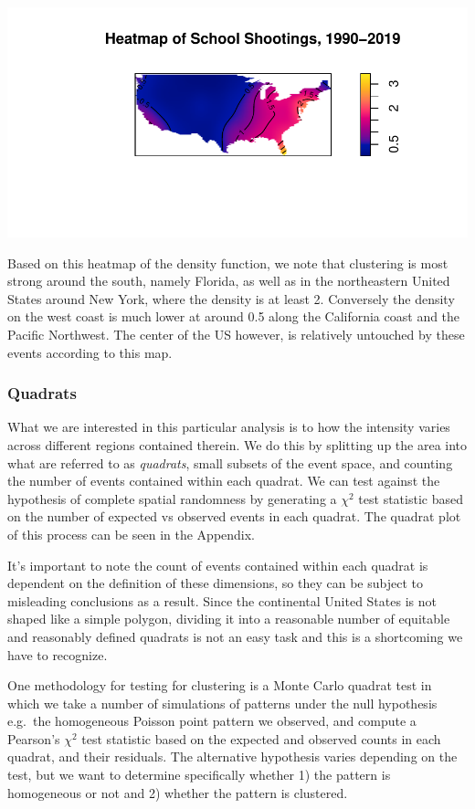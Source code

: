 \documentclass[
  12pt,
]{article}
\begin{document}
\includegraphics{JStevenRaquel_STATS295_Final_files/figure-latex/density-90-19-1.pdf}

Based on this heatmap of the density function, we note that clustering
is most strong around the south, namely Florida, as well as in the
northeastern United States around New York, where the density is at
least 2. Conversely the density on the west coast is much lower at
around 0.5 along the California coast and the Pacific Northwest. The
center of the US however, is relatively untouched by these events
according to this map.

\hypertarget{quadrats}{%
\subsubsection{Quadrats}\label{quadrats}}

What we are interested in this particular analysis is to how the
intensity varies across different regions contained therein. We do this
by splitting up the area into what are referred to as \emph{quadrats},
small subsets of the event space, and counting the number of events
contained within each quadrat. We can test against the hypothesis of
complete spatial randomness by generating a \(\chi^2\) test statistic
based on the number of expected vs observed events in each quadrat. The
quadrat plot of this process can be seen in the Appendix.

It's important to note the count of events contained within each quadrat
is dependent on the definition of these dimensions, so they can be
subject to misleading conclusions as a result. Since the continental
United States is not shaped like a simple polygon, dividing it into a
reasonable number of equitable and reasonably defined quadrats is not an
easy task and this is a shortcoming we have to recognize.

One methodology for testing for clustering is a Monte Carlo quadrat test
in which we take a number of simulations of patterns under the null
hypothesis e.g.~the homogeneous Poisson point pattern we observed, and
compute a Pearson's \(\chi^2\) test statistic based on the expected and
observed counts in each quadrat, and their residuals. The alternative
hypothesis varies depending on the test, but we want to determine
specifically whether 1) the pattern is homogeneous or not and 2) whether
the pattern is clustered.
\end{document}
